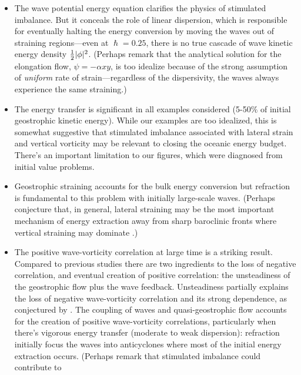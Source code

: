 \documentclass{jfm}
\begin{document}
\begin{itemize}
  \item The wave potential energy equation clarifies the physics of stimulated
        imbalance. But it conceals the role of linear dispersion, which is responsible
        for eventually halting the energy conversion by moving the waves out of
        straining regions---even at $\hslash=0.25$, there is no true cascade of
        wave kinetic energy density $\tfrac{1}{2} |\phi|^2$. (Perhaps remark that the
        analytical solution for the elongation flow, $\psi=-\alpha x y$, is too
        idealize because of the strong assumption of \textit{uniform} rate of
        strain---regardless of the dispersivity, the waves always experience the
        same straining.)
  \item The energy transfer is significant in all examples considered (5-50$\%$
        of initial geostrophic kinetic energy). While our examples are too idealized,
        this is somewhat suggestive that stimulated imbalance associated with lateral
        strain and vertical vorticity may be relevant to closing the oceanic energy
        budget. There's an important limitation to our figures, which were diagnosed
        from initial value problems.
  \item Geostrophic straining accounts for the bulk energy conversion but refraction
        is fundamental to this problem with initially large-scale waves. (Perhaps
        conjecture that, in general, lateral straining may be the most important mechanism
        of energy extraction away from sharp baroclinic fronts where vertical straining
        may dominate \citep{shakespeare_hogg2017}.)
  \item The positive wave-vorticity correlation at large time is a striking result.
        Compared to previous studies
        there are two ingredients to the loss of negative correlation, and eventual
        creation of positive correlation: the unsteadiness of the geostrophic flow
        plus the wave feedback. Unsteadiness partially explains the loss of negative
        wave-vorticity correlation and its strong dependence, as conjectured by \cite{danioux_etal2015}.
        The coupling of waves and quasi-geostrophic flow accounts for the creation of
        positive wave-vorticity correlations, particularly when there's vigorous
        energy transfer (moderate to weak dispersion): refraction initially focus the waves
        into anticyclones where most of the initial energy extraction occurs.
        (Perhaps remark that stimulated imbalance could contribute to

\end{itemize}
\end{document}
